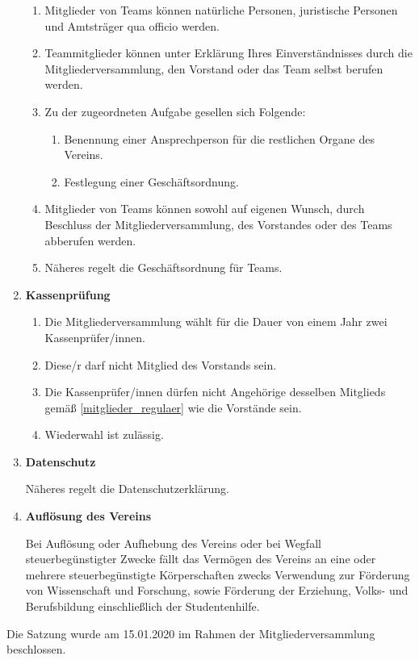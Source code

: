 \documentclass[german]{article}
\newcommand{\paragr}[1]{\item \textsf{\textbf{#1}}}
\begin{document}
\begin{enumerate}
\begin{enumerate}
\item Mitglieder von Teams können natürliche Personen, juristische Personen und Amtsträger qua officio werden.

\item Teammitglieder können unter Erklärung Ihres Einverständnisses durch die Mitgliederversammlung, den Vorstand oder das Team selbst berufen werden.

\item Zu der zugeordneten Aufgabe gesellen sich Folgende:
\begin{enumerate}
\item Benennung einer Ansprechperson für die restlichen Organe des Vereins.
\item Festlegung einer Geschäftsordnung.
\end{enumerate}

\item Mitglieder von Teams können sowohl auf eigenen Wunsch, durch Beschluss der Mitgliederversammlung, des Vorstandes oder des Teams abberufen werden.

\item Näheres regelt die Geschäftsordnung für Teams.

\end{enumerate}


\paragr{Kassenprüfung}
\begin{enumerate}

\item Die Mitgliederversammlung wählt für die Dauer von einem Jahr zwei Kassenprüfer/innen.

\item Diese/r darf nicht Mitglied des Vorstands sein.

\item Die Kassenprüfer/innen dürfen nicht Angehörige desselben Mitglieds gemäß \ref{mitglieder_regulaer} wie die Vorstände sein.

\item Wiederwahl ist zulässig.

\end{enumerate}


\paragr{Datenschutz}

Näheres regelt die Datenschutzerklärung.


\paragr{Auflösung des Vereins}

Bei Auflösung oder Aufhebung des Vereins oder bei Wegfall steuerbegünstigter Zwecke fällt das Vermögen des Vereins an eine oder mehrere steuerbegünstigte Körperschaften zwecks Verwendung zur Förderung von Wissenschaft und Forschung, sowie Förderung der Erziehung, Volks- und Berufsbildung einschließlich der Studentenhilfe.


\end{enumerate}
\vspace{2cm}
Die Satzung wurde am 15.01.2020 im Rahmen der Mitgliederversammlung beschlossen.
	
\end{document}
